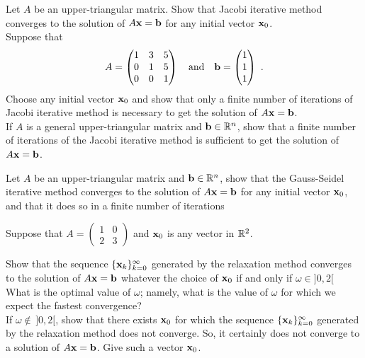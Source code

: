 \begin{question}
 Let $A$ be an \nn upper-triangular matrix.  Show that Jacobi
iterative method converges to the solution of $A\mathbf{x} = \mathbf{b}$ for any
initial vector $\mathbf{x}_0$.\\
 Suppose that
\[
A= \begin{pmatrix} 1 & 3 & 5 \\ 0 & 1 & 5 \\ 0 & 0 & 1 \end{pmatrix}
\quad \text{and} \quad
\mathbf{b} = \begin{pmatrix} 1 \\ 1 \\ 1 \end{pmatrix} \ .
\]
Choose any initial vector $\mathbf{x}_0$ and show that only a finite
number of iterations of Jacobi iterative method is necessary to get
the solution of $A\mathbf{x} = \mathbf{b}$.\\
 If $A$ is a general \nn upper-triangular matrix and
$\mathbf{b}\in \mathbb{R}^n$, show that a finite number of iterations of the Jacobi
iterative method is sufficient to get the solution of $A\mathbf{x} = \mathbf{b}$.
\label{solvBQ12}
\end{question}

\begin{question}
Let $A$ be an \nn upper-triangular matrix and $\mathbf{b}\in \mathbb{R}^n$, show
that the Gauss-Seidel iterative method converges to the solution of
$A\mathbf{x} = \mathbf{b}$ for any initial vector $\mathbf{x}_0$, and that it
does so in a finite number of iterations
\label{solvBQ13}
\end{question}

\begin{question}
Suppose that
$\displaystyle A = \begin{pmatrix} 1 & 0 \\ 2 & 3 \end{pmatrix}$
and $\mathbf{x}_0$ is any vector in $\mathbb{R}^2$.

 Show that the sequence
$\{\mathbf{x}_k\}_{k=0}^\infty$ generated by the relaxation method
converges to the solution of $A\mathbf{x}=\mathbf{b}$ whatever the choice of
$\mathbf{x}_0$ if and only if $\omega \in ]0,2[$\\
 What is the optimal value of $\omega$; namely, what is the
value of $\omega$ for which we expect the fastest convergence?\\
 If $\omega \not\in\, ]0,2[$, show that there exists
$\mathbf{x}_0$ for which the sequence $\{\mathbf{x}_k\}_{k=0}^\infty$
generated by the relaxation method does not converge.  So, it
certainly does not converge to a solution of $A\mathbf{x}=\mathbf{b}$.  Give
such a vector $\mathbf{x}_0$.
\label{solvBQ14}
\end{question}

